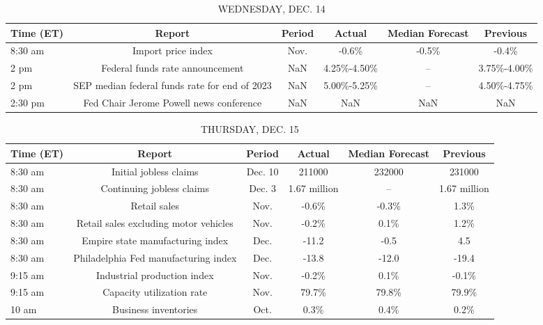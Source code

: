 \documentclass{article}%
\begin{document}
%


\begin{table}[htbp]%
\caption{WEDNESDAY, DEC. 14}%
\centering%
\begin{adjustbox}{width=1\textwidth}%
\begin{tabular}{lccccc}
\toprule
Time (ET) &                                        Report & Period &      Actual & Median Forecast &    Previous \\
\midrule
  8:30 am &                            Import price index &   Nov. &       -0.6\% &           -0.5\% &       -0.4\% \\
     2 pm &               Federal funds rate announcement &    NaN & 4.25\%-4.50\% &              -- & 3.75\%-4.00\% \\
     2 pm & SEP median federal funds rate for end of 2023 &    NaN & 5.00\%-5.25\% &              -- & 4.50\%-4.75\% \\
  2:30 pm &       Fed Chair Jerome Powell news conference &    NaN &         NaN &             NaN &         NaN \\
\bottomrule
\end{tabular}
%
\end{adjustbox}%
\end{table}

%


\begin{table}[htbp]%
\caption{THURSDAY, DEC. 15}%
\centering%
\begin{adjustbox}{width=1\textwidth}%
\begin{tabular}{lccccc}
\toprule
Time (ET) &                                Report &  Period &       Actual & Median Forecast &     Previous \\
\midrule
  8:30 am &                Initial jobless claims & Dec. 10 &       211000 &          232000 &       231000 \\
  8:30 am &             Continuing jobless claims &  Dec. 3 & 1.67 million &              -- & 1.67 million \\
  8:30 am &                          Retail sales &    Nov. &        -0.6\% &           -0.3\% &         1.3\% \\
  8:30 am & Retail sales excluding motor vehicles &    Nov. &        -0.2\% &            0.1\% &         1.2\% \\
  8:30 am &      Empire state manufacturing index &    Dec. &        -11.2 &            -0.5 &          4.5 \\
  8:30 am &  Philadelphia Fed manufacturing index &    Dec. &        -13.8 &           -12.0 &        -19.4 \\
  9:15 am &           Industrial production index &    Nov. &        -0.2\% &            0.1\% &        -0.1\% \\
  9:15 am &             Capacity utilization rate &    Nov. &        79.7\% &           79.8\% &        79.9\% \\
    10 am &                  Business inventories &    Oct. &         0.3\% &            0.4\% &         0.2\% \\
\bottomrule
\end{tabular}
%
\end{adjustbox}%
\end{table}
\end{document}
